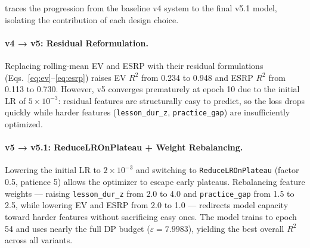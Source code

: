  traces the progression from the baseline v4 system to
the final v5.1 model, isolating the contribution of each design choice.

\begin{table}[h]
  \centering
  \caption{Ablation study: cumulative improvements from v4 to v5.1.
           All metrics evaluated on the held-out test split.
           \textbf{Bold} marks the best value per column.}
  \label{tab:ablation}
\end{table}

\paragraph{v4 → v5: Residual Reformulation.}
Replacing rolling-mean EV and ESRP with their residual formulations
(Eqs.~\ref{eq:ev}--\ref{eq:esrp}) raises EV $R^2$ from 0.234 to 0.948
and ESRP $R^2$ from 0.113 to 0.730.
However, v5 converges prematurely at epoch 10 due to the initial LR of
$5\times10^{-3}$: residual features are structurally easy to predict,
so the loss drops quickly while harder features (\texttt{lesson\_dur\_z},
\texttt{practice\_gap}) are insufficiently optimized.

\paragraph{v5 → v5.1: ReduceLROnPlateau + Weight Rebalancing.}
Lowering the initial LR to $2\times10^{-3}$ and switching to
\texttt{ReduceLROnPlateau} (factor 0.5, patience 5) allows the optimizer
to escape early plateaus.
Rebalancing feature weights — raising \texttt{lesson\_dur\_z} from 2.0 to
4.0 and \texttt{practice\_gap} from 1.5 to 2.5, while lowering EV and
ESRP from 2.0 to 1.0 — redirects model capacity toward harder features
without sacrificing easy ones.
The model trains to epoch 54 and uses nearly the full DP budget
($\varepsilon{=}7.9983$), yielding the best overall $R^2$ across all variants.

